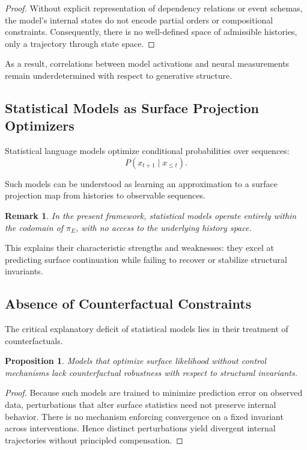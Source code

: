 \documentclass[11pt]{article}
\newtheorem{remark}{Remark}
\newtheorem{proposition}{Proposition}
\begin{document}
\begin{proof}
Without explicit representation of dependency relations or event schemas, the model’s internal states do not encode partial orders or compositional constraints. Consequently, there is no well-defined space of admissible histories, only a trajectory through state space.
\end{proof}

As a result, correlations between model activations and neural measurements remain underdetermined with respect to generative structure.

\subsection{Statistical Models as Surface Projection Optimizers}

Statistical language models optimize conditional probabilities over sequences:
\[
P(x_{t+1} \mid x_{\leq t}).
\]

Such models can be understood as learning an approximation to a surface projection map from histories to observable sequences.

\begin{remark}
In the present framework, statistical models operate entirely within the codomain of $\pi_E$, with no access to the underlying history space.
\end{remark}

This explains their characteristic strengths and weaknesses: they excel at predicting surface continuation while failing to recover or stabilize structural invariants.

\subsection{Absence of Counterfactual Constraints}

The critical explanatory deficit of statistical models lies in their treatment of counterfactuals.

\begin{proposition}
Models that optimize surface likelihood without control mechanisms lack counterfactual robustness with respect to structural invariants.
\end{proposition}

\begin{proof}
Because such models are trained to minimize prediction error on observed data, perturbations that alter surface statistics need not preserve internal behavior. There is no mechanism enforcing convergence on a fixed invariant across interventions. Hence distinct perturbations yield divergent internal trajectories without principled compensation.
\end{proof}
\end{document}
